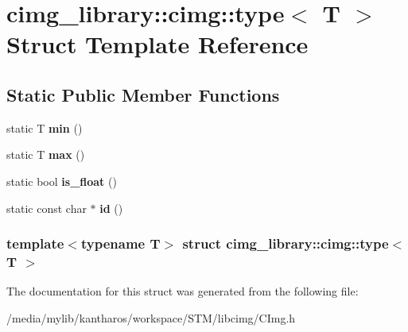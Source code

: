 \hypertarget{structcimg__library_1_1cimg_1_1type}{
\section{cimg\_\-library::cimg::type$<$ T $>$ Struct Template Reference}
\label{structcimg__library_1_1cimg_1_1type}
}
\subsection*{Static Public Member Functions}
\begin{DoxyCompactItemize}
\item 
\hypertarget{structcimg__library_1_1cimg_1_1type_ac4283ac279ac80e436e9ec4d03d6a7b3}{
static T {\bfseries min} ()}
\label{structcimg__library_1_1cimg_1_1type_ac4283ac279ac80e436e9ec4d03d6a7b3}

\item 
\hypertarget{structcimg__library_1_1cimg_1_1type_a7112048ca6edb4576610cab754b29e29}{
static T {\bfseries max} ()}
\label{structcimg__library_1_1cimg_1_1type_a7112048ca6edb4576610cab754b29e29}

\item 
\hypertarget{structcimg__library_1_1cimg_1_1type_ac60cdaeac5043ff78a003863238a11e0}{
static bool {\bfseries is\_\-float} ()}
\label{structcimg__library_1_1cimg_1_1type_ac60cdaeac5043ff78a003863238a11e0}

\item 
\hypertarget{structcimg__library_1_1cimg_1_1type_a6fd4f3a565e20cee94d0bb4077f58fbd}{
static const char $\ast$ {\bfseries id} ()}
\label{structcimg__library_1_1cimg_1_1type_a6fd4f3a565e20cee94d0bb4077f58fbd}

\end{DoxyCompactItemize}
\subsubsection*{template$<$typename T$>$ struct cimg\_\-library::cimg::type$<$ T $>$}



The documentation for this struct was generated from the following file:\begin{DoxyCompactItemize}
\item 
/media/mylib/kantharos/workspace/STM/libcimg/CImg.h\end{DoxyCompactItemize}

